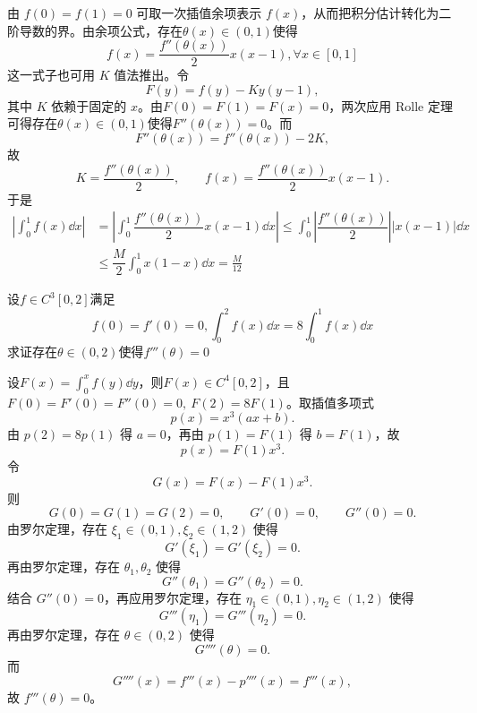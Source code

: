 \begin{solution}
由 $f(0)=f(1)=0$ 可取一次插值余项表示 $f(x)$，从而把积分估计转化为二阶导数的界。由余项公式，存在$\theta(x)\in(0,1)$使得
\[f(x)=\frac{f''(\theta(x))}{2}x(x-1),\forall x\in[0,1]\]
这一式子也可用 $K$ 值法推出。令
\[
F(y)=f(y)-Ky(y-1),
\]
其中 $K$ 依赖于固定的 $x$。由$F(0)=F(1)=F(x)=0$，两次应用 Rolle 定理可得存在$\theta(x)\in(0,1)$使得$F''(\theta(x))=0$。而
\[
F''(\theta(x))=f''(\theta(x))-2K,
\]
故
\[
K=\frac{f''(\theta(x))}{2},
\qquad
f(x)=\frac{f''(\theta(x))}{2}x(x-1).
\]
于是
\begin{align*}
    \left|\int_0^1f(x)\dd x\right|&=\left|\int_0^1\dfrac{f''(\theta(x))}{2}x(x-1)\dd x \right|\leqslant \int_0^1\left|\dfrac{f''(\theta(x))}{2}\right||x(x-1)|\dd x\\
&\leqslant \dfrac{M}{2}\int_0^1 x(1-x)\dd x=\frac{M}{12}
\end{align*}
\end{solution}
\newpage
\begin{example}[$f'''(\theta)=0$]
    设$f\in C^3[0,2]$满足\[f(0)=f'(0)=0,\int_0^2f(x)\dd x=8\int_0^1f(x)\dd x\]求证存在$\theta\in(0,2)$使得$f'''(\theta)=0$
\end{example}
\begin{solution}
设$\displaystyle F(x)=\int_0^x f(y)\dd y$，则$F(x)\in C^4[0,2]$，且$F(0)=F'(0)=F''(0)=0,\ F(2)=8F(1)$。取插值多项式
\[
p(x)=x^3(ax+b).
\]
由 $p(2)=8p(1)$ 得 $a=0$，再由 $p(1)=F(1)$ 得 $b=F(1)$，故
\[
p(x)=F(1)x^3.
\]
令
\[
G(x)=F(x)-F(1)x^3.
\]
则
\[
G(0)=G(1)=G(2)=0,\qquad G'(0)=0,\qquad G''(0)=0.
\]
由罗尔定理，存在 $\xi_1\in(0,1),\xi_2\in(1,2)$ 使得
\[
G'(\xi_1)=G'(\xi_2)=0.
\]
再由罗尔定理，存在 $\theta_1,\theta_2$ 使得
\[
G''(\theta_1)=G''(\theta_2)=0.
\]
结合 $G''(0)=0$，再应用罗尔定理，存在 $\eta_1\in(0,1),\eta_2\in(1,2)$ 使得
\[
G'''(\eta_1)=G'''(\eta_2)=0.
\]
再由罗尔定理，存在 $\theta\in(0,2)$ 使得
\[
G''''(\theta)=0.
\]
而
\[
G''''(x)=f'''(x)-p''''(x)=f'''(x),
\]
故 $f'''(\theta)=0$。
\end{solution}

